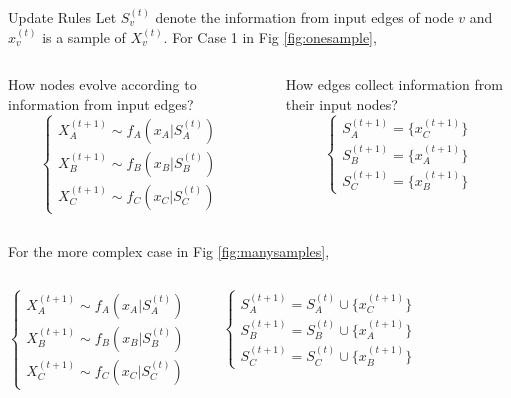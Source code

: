 \documentclass[10pt]{beamer}
\begin{document}
\begin{CJK*}{UTF8}{gbsn}
\begin{frame}{Update Rules}
    Let $S_{v}^{(t)}$ denote the information from input edges of node $v$ and $x_v^{(t)}$ is a sample of $X_v^{(t)}$. For Case 1 in Fig \ref{fig:onesample}, 
    \begin{columns}[T,onlytextwidth]
    \alert{How nodes evolve according to information from input edges?}
    \begin{equation*} \label{eq:evolve}
    \left\{
         \begin{array}{lr}
         X_A^{(t+1)} \sim f_A(x_A|S_{A}^{(t)}) &  \\
         X_B^{(t+1)} \sim f_B(x_B|S_{B}^{(t)}) & \\
         X_C^{(t+1)} \sim f_C(x_C|S_{C}^{(t)}) &  
         \end{array}
    \right.
    \end{equation*}
    
    \alert{How edges collect information from their input nodes?}
    \begin{equation*} \label{eq:collect}
    \left\{
         \begin{array}{lr}
         S^{(t+1)}_A = \{x_C^{(t+1)}\} \\
         S^{(t+1)}_B = \{x_A^{(t+1)}\}\\
         S^{(t+1)}_C = \{x_B^{(t+1)}\}  
         \end{array}
    \right.
    \end{equation*}


  \end{columns}
  
    For the more complex case in Fig \ref{fig:manysamples}, 
    \begin{columns}[T,onlytextwidth]
    \begin{equation*} \label{eq:evolve}
    \left\{
         \begin{array}{lr}
         X_A^{(t+1)} \sim f_A(x_A|S_{A}^{(t)}) &  \\
         X_B^{(t+1)} \sim f_B(x_B|S_{B}^{(t)}) & \\
         X_C^{(t+1)} \sim f_C(x_C|S_{C}^{(t)}) &  
         \end{array}
    \right.
    \end{equation*}
    
    \begin{equation*} \label{eq:collect}
    \left\{
     \begin{array}{lr}
     S^{(t+1)}_A = S_{A}^{(t)} \cup \{x_C^{(t+1)}\} \\
     S^{(t+1)}_B = S_{B}^{(t)} \cup \{x_A^{(t+1)}\}\\
     S^{(t+1)}_C = S_{C}^{(t)} \cup \{x_B^{(t+1)}\}  
     \end{array}
    \right.
    \end{equation*}
  \end{columns}
\end{frame}



\end{CJK*}
\end{document}
